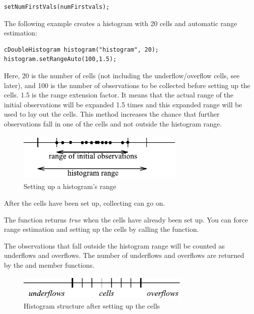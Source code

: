 \begin{verbatim}
setNumFirstVals(numFirstvals);
\end{verbatim}

The following example creates a histogram with 20 cells and automatic
range estimation:

\begin{verbatim}
cDoubleHistogram histogram("histogram", 20);
histogram.setRangeAuto(100,1.5);
\end{verbatim}


Here, 20 is the number of cells (not including the underflow/overflow
cells, see later), and 100 is the number of observations to be
collected before setting up the cells. 1.5 is the range extension
factor. It means that the actual range of the initial observations
will be expanded 1.5 times and this expanded range will be used to lay
out the cells. This method increases the chance that further
observations fall in one of the cells and not outside the histogram
range.

\begin{figure}[htbp]
  \begin{center}
    \includegraphics[width=3.215in, height=0.930in]{figures/usmanFig12}
    \caption{Setting up a histogram's range}
  \end{center}
\end{figure}

After the cells have been set up, collecting can go on.

The  function returns \textit{true} when the cells have
already been set up. You can force range estimation and setting
up the cells by calling the  function.

The observations that fall outside the histogram range will be counted
as underflows and overflows. The number of underflows and overflows
are returned by the  and 
member functions.

\begin{figure}[htbp]
\begin{center}
  \includegraphics[width=3.310in, height=0.467in]{figures/usmanFig13}
  \caption{Histogram structure after setting up the cells}
\end{center}
\end{figure}

